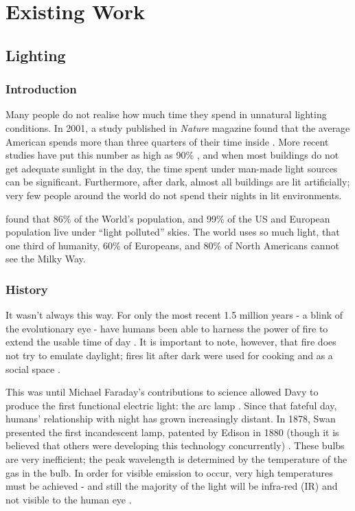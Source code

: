 
\chapter{Existing Work}
\label{Chap:Lit}

\section{Lighting}

\subsection{Introduction}

Many people do not realise how much time they spend in unnatural lighting conditions. In 2001, a study published in \textit{Nature} magazine found that the average American spends more than three quarters of their time inside \citep{klepeisNationalHumanActivity2001}. More recent studies have put this number as high as 90\% \citep{opiniumBritsSpend902018}, and when most buildings do not get adequate sunlight in the day, the time spent under man-made light sources can be significant. Furthermore, after dark, almost all buildings are lit artificially; very few people around the world do not spend their nights in lit environments.

\citet{falchiNewWorldAtlas2016} found that 86\% of the World's population, and 99\% of the US and European population live under ``light polluted'' skies. The world uses so much light, that one third of humanity, 60\% of Europeans, and 80\% of North Americans cannot see the Milky Way. 

\subsection{History}

It wasn't always this way. For only the most recent 1.5 million years - a blink of the evolutionary eye - have humans been able to harness the power of fire to extend the usable time of day \citep{gowlettEarliestFireAfrica2013}. It is important to note, however, that fire does not try to emulate daylight; fires lit after dark were used for cooking and as a social space \citep{gowlettDiscoveryFireHumans2016}.

This was until Michael Faraday's contributions to science allowed Davy to produce the first functional electric light: the arc lamp \citep{knightHumphryDavyScience1998}. Since that fateful day, humans' relationship with night has grown increasingly distant. In 1878, Swan presented the first  incandescent lamp, patented by Edison in 1880 (though it is believed that others were developing this technology concurrently) %
. These bulbs are very inefficient; the peak wavelength is determined by the temperature of the gas in the bulb. In order for visible emission to occur, very high temperatures must be achieved - and still the majority of the light will be infra-red (IR) and not visible to the human eye \citep{montoyaIndoorLightingTechniques2017}.

